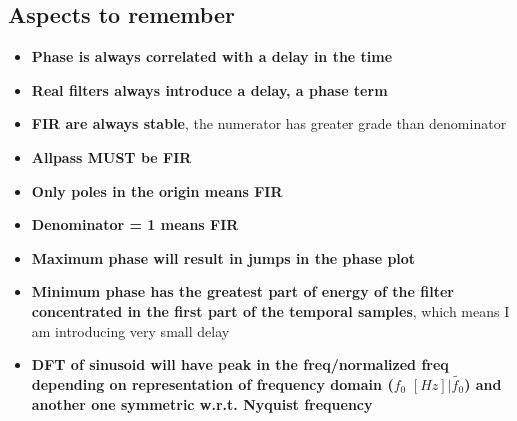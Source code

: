 \subsection{Aspects to remember}
\begin{itemize}
    \item \textbf{Phase is always correlated with a delay in the time}
    \item \textbf{Real filters always introduce a delay, a phase term}
    \item \textbf{FIR are always stable}, the numerator has greater grade than denominator
    \item \textbf{Allpass MUST be FIR}
    \item \textbf{Only poles in the origin means FIR}
    \item \textbf{Denominator = 1 means FIR}
    \item \textbf{Maximum phase will result in jumps in the phase plot}
    \item \textbf{Minimum phase has the greatest part of energy of the filter concentrated in the first part of the temporal samples}, which means I am introducing very small delay
    \item \textbf{DFT of sinusoid will have peak in the freq/normalized freq depending on representation of frequency domain ($f_0\,\,[Hz]|\tilde{f_0}$) and another one symmetric w.r.t. Nyquist frequency}
\end{itemize}

